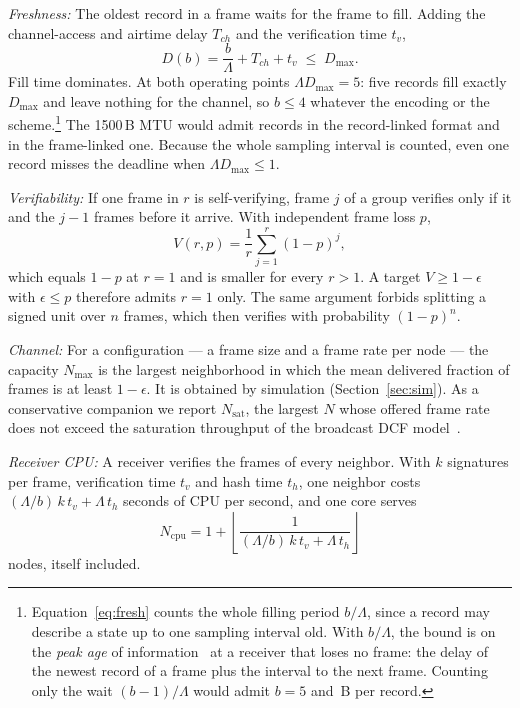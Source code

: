 \documentclass[lineno,pdflatex,sn-mathphys-num]{sn-jnl}
\newcommand{\runin}[1]{\textit{#1:}}
\renewcommand{\_}{\authbcunderscore\allowbreak}
\begin{document}
\runin{Freshness} The oldest record in a frame waits for the frame to fill. Adding the
channel-access and airtime delay $T_{ch}$ and the verification time $t_v$,
\begin{equation}
D(b) = \frac{b}{\Lambda} + T_{ch} + t_v \;\leq\; D_{\max}.
\label{eq:fresh}
\end{equation}
Fill time dominates. At both operating points $\Lambda D_{\max} = 5$: five records fill exactly
$D_{\max}$ and leave nothing for the channel, so $b \leq 4$ whatever the encoding or the
scheme.\footnote{Equation~\eqref{eq:fresh} counts the whole filling period $b/\Lambda$, since a
record may describe a state up to one sampling interval old. With $b/\Lambda$, the bound is on
the \emph{peak age} of information~\cite{yates2021aoi} at a receiver that loses no frame: the
delay of the newest record of a frame plus the interval to the next frame. Counting only the
wait $(b-1)/\Lambda$ would admit $b=5$ and \bprLeanFive\,B per record.} The 1500\,B MTU would
admit \mtuRecsFirst{} records in the record-linked format and \mtuRecsLean{} in the frame-linked
one. Because the whole sampling interval is counted, even one record misses the deadline when
$\Lambda D_{\max} \leq 1$.

\runin{Verifiability} If one frame in $r$ is self-verifying, frame $j$ of a group verifies only if
it and the $j-1$ frames before it arrive. With independent frame loss $p$,
\begin{equation}
V(r,p) = \frac{1}{r}\sum_{j=1}^{r}(1-p)^{j},
\label{eq:v}
\end{equation}
which equals $1-p$ at $r=1$ and is smaller for every $r>1$. A target $V \geq 1-\epsilon$ with
$\epsilon \leq p$ therefore admits $r=1$ only. The same argument forbids splitting a signed unit
over $n$ frames, which then verifies with probability $(1-p)^n$.

\runin{Channel} For a configuration --- a frame size and a frame rate per node --- the capacity
$N_{\max}$ is the largest neighborhood in which the mean delivered fraction of frames is at least
$1-\epsilon$. It is obtained by simulation (Section~\ref{sec:sim}). As a conservative companion
we report $N_{\mathrm{sat}}$, the largest $N$ whose offered frame rate does not exceed the
saturation throughput of the broadcast DCF model~\cite{machen2008}.

\runin{Receiver CPU} A receiver verifies the frames of every neighbor. With $k$ signatures per
frame, verification time $t_v$ and hash time $t_h$, one neighbor costs
$(\Lambda/b)\,k\,t_v + \Lambda\,t_h$ seconds of CPU per second, and one core serves
\begin{equation}
N_{\mathrm{cpu}} = 1 + \left\lfloor \frac{1}{(\Lambda/b)\,k\,t_v + \Lambda\,t_h} \right\rfloor
\label{eq:cpu}
\end{equation}
nodes, itself included.
\end{document}

